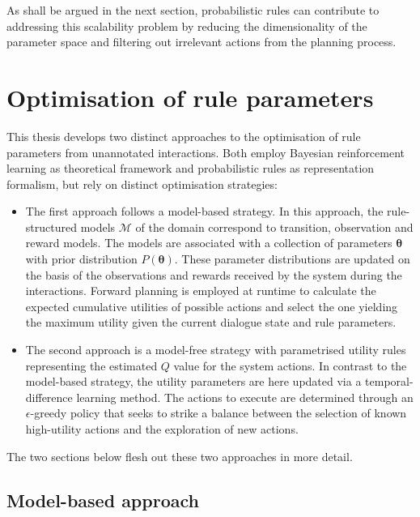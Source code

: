As shall be argued in the next section, probabilistic rules can contribute to addressing this scalability problem by reducing the dimensionality of the parameter space and filtering out irrelevant actions from the planning process.

\section{Optimisation of rule parameters}
\label{sec:rl-ruleparams}

This thesis develops two distinct approaches to the optimisation of rule parameters from unannotated interactions. Both employ Bayesian reinforcement learning as theoretical framework and probabilistic rules as representation formalism, but rely on distinct optimisation strategies:

\begin{itemize}
\item The first approach follows a model-based strategy.  In this approach, the rule-structured models $\mathcal{M}$ of the domain correspond to transition, observation and reward models. The models are associated with a collection of parameters $\boldsymbol\theta$ with prior distribution $P(\boldsymbol\theta)$.  These parameter distributions are updated on the basis of the observations and rewards received by the system during the interactions. Forward planning is employed at runtime to calculate the expected cumulative utilities of possible actions and select the one yielding the maximum utility given the current dialogue state and rule parameters. 

\item The second approach is a model-free strategy with parametrised utility rules representing the estimated $Q$ value for the system actions. In contrast to the model-based strategy, the utility parameters are here updated via a temporal-difference learning method.  The actions to execute are determined through an $\epsilon$-greedy policy that seeks to strike a balance between the selection of known high-utility actions and the exploration of new actions.

\end{itemize}

The two sections below flesh out these two approaches in more detail. 

\subsection{Model-based approach}
\label{sec:modelbased}

